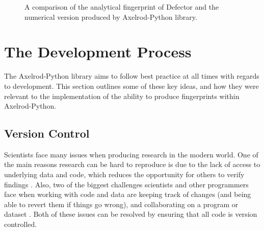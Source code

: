 \begin{figure}[htbp!]
\caption{A comparison of the analytical fingerprint of Defector and the numerical version produced by Axelrod-Python library.}
\label{fig:Defector-comparison}
\end{figure}

\section{The Development Process}\label{sec:dev_process}

The Axelrod-Python library aims to follow best practice at all times with regards to development.
This section outlines some of these key ideas, and how they were relevant to the implementation of the ability to produce fingerprints within Axelrod-Python.

\subsection{Version Control}
Scientists face many issues when producing research in the modern world.
One of the main reasons research can be hard to reproduce is due to the lack of access to underlying data and code, which reduces the opportunity for others to verify findings \cite{Schwab2000, Ince2012}.
Also, two of the biggest challenges scientists and other programmers face when working with code and data are keeping track of changes (and being able to revert them if things go wrong), and collaborating on a program or dataset \cite{Wilson2013, Matthews}.
Both of these issues can be resolved by ensuring that all code is version controlled.

